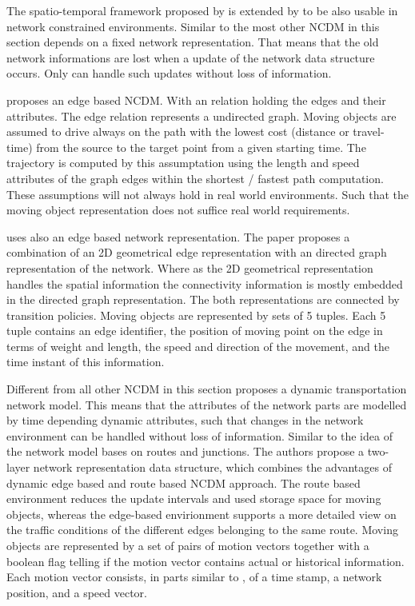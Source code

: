 \documentclass[a4paper]{article}
\begin{document}
The spatio-temporal framework proposed by
\cite{DataModelDataStructureGueting,RepresentingMovingObjectsGueting} is extended
by \cite{NetworkGueting} to be also usable in network constrained environments.
Similar to the most other NCDM in this section \cite{NetworkGueting} depends on
a fixed network representation. That means that the old network informations are lost when a
update of the network data structure occurs. Only \cite{DynamicTransportNetworkDing}
can handle such updates without loss of information.

\cite{NetworkVazirgiannis} proposes an edge based NCDM. With an relation holding
the edges and their attributes. The edge relation represents a undirected graph.
Moving objects are assumed to drive always on the path with the lowest cost
(distance or travel-time) from the source to the target point from a given
starting time. The trajectory is computed by this assumptation using the length
and speed attributes of the graph edges within the shortest / fastest path computation.
These assumptions will not always hold in real world environments. Such that the
moving object representation does not suffice real world requirements.

\cite{NetworkJensen} uses also an edge based network representation. The paper
proposes a combination of an 2D geometrical edge representation with an directed
graph representation of the network. Where as the 2D geometrical representation
handles the spatial information the connectivity information is mostly embedded
in the directed graph representation. The both representations are connected by
transition policies. Moving objects are represented by sets of 5 tuples. Each
5 tuple contains an edge identifier, the position of moving point on the edge
in terms of weight and length, the speed and direction of the movement, and
the time instant of this information.

Different from all other NCDM in this section \cite{DynamicTransportNetworkDing}
proposes a dynamic transportation network model. This means that the attributes
of the network parts are modelled by time depending dynamic attributes, such that
changes in the network environment can be handled without loss of information.
Similar to \cite{NetworkGueting} the idea of the network model bases
on routes and junctions. The authors propose a two-layer network representation
data structure, which combines the advantages of dynamic edge based
\cite{DynNetworkModEdgeGueting} and route based \cite{DynNetworkModRouteGueting}
NCDM approach. The route based environment reduces the update intervals and
used storage space for moving objects, whereas the edge-based envirionment supports
a more detailed view on the traffic conditions of the different edges belonging
to the same route. Moving objects are represented by a set of pairs of
motion vectors together with a boolean flag telling if the motion vector contains
actual or historical information. Each motion vector consists, in parts
similar to \cite{NetworkJensen}, of a time stamp, a network position, and a speed vector.
\end{document}
